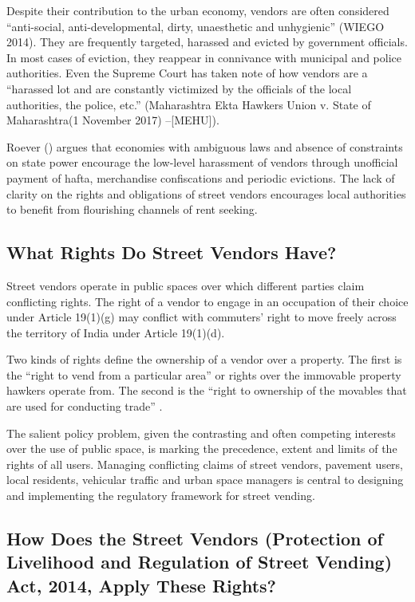 \documentclass[a4paper, 12pt, twoside]{article}
\begin{document}
{Despite their contribution to the urban economy, vendors are often considered “anti-social, anti-developmental, dirty, unaesthetic and unhygienic” (WIEGO 2014). They are frequently targeted, harassed and evicted by government officials. In most cases of eviction, they reappear in connivance with municipal and police authorities. Even the Supreme Court has taken note of how vendors are a “harassed lot and are constantly victimized by the officials of the local authorities, the police, etc.” (Maharashtra Ekta Hawkers Union v. State of Maharashtra(1 November 2017) –[MEHU]).

Roever (\cite*{sallypaper}) argues that economies with ambiguous laws and absence of constraints on state power encourage the low-level harassment of vendors through unofficial payment of hafta, merchandise confiscations and periodic evictions. The lack of clarity on the rights and obligations of street vendors encourages local authorities to benefit from flourishing channels of rent seeking.

\subsection*{What Rights Do Street Vendors Have?}
Street vendors operate in public spaces over which different parties claim conflicting rights. The right of a  vendor to engage in an occupation of their choice under Article 19(1)(g) may conflict with commuters’ right to move freely across the territory of India under Article 19(1)(d).

Two kinds of rights define the ownership of a vendor over a property. The first is the “right to vend from a particular area” or rights over the immovable property hawkers operate from. The second is the “right to ownership of the movables that are used for conducting trade” \parencite{ccspaper}.

The salient policy problem, given the contrasting and often competing interests over the use of public space, is marking the precedence, extent and limits of the rights of all users. Managing conflicting claims of street vendors, pavement users, local residents, vehicular traffic and urban space managers is central to designing and implementing the regulatory framework for street vending.
\newpage
\subsection*{How Does the Street Vendors (Protection of Livelihood and Regulation of Street Vending) Act, 2014, Apply These Rights?}

}
\end{document}
